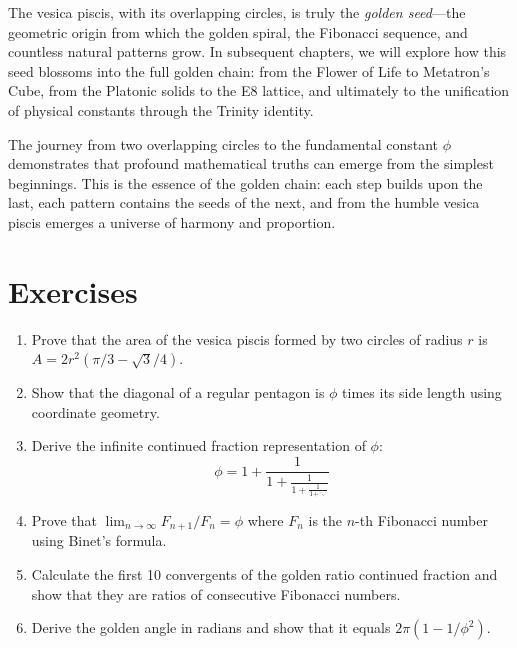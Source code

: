 The vesica piscis, with its overlapping circles, is truly the \emph{golden seed}—the geometric origin from which the golden spiral, the Fibonacci sequence, and countless natural patterns grow. In subsequent chapters, we will explore how this seed blossoms into the full golden chain: from the Flower of Life to Metatron's Cube, from the Platonic solids to the E8 lattice, and ultimately to the unification of physical constants through the Trinity identity.

The journey from two overlapping circles to the fundamental constant $\phi$ demonstrates that profound mathematical truths can emerge from the simplest beginnings. This is the essence of the golden chain: each step builds upon the last, each pattern contains the seeds of the next, and from the humble vesica piscis emerges a universe of harmony and proportion.

\section{Exercises}

\begin{enumerate}
    \item Prove that the area of the vesica piscis formed by two circles of radius $r$ is $A = 2r^2(\pi/3 - \sqrt{3}/4)$.
    \item Show that the diagonal of a regular pentagon is $\phi$ times its side length using coordinate geometry.
    \item Derive the infinite continued fraction representation of $\phi$:
    \[
    \phi = 1 + \frac{1}{1 + \frac{1}{1 + \frac{1}{1 + \ddots}}}
    \]
    \item Prove that $\lim_{n \to \infty} F_{n+1}/F_n = \phi$ where $F_n$ is the $n$-th Fibonacci number using Binet's formula.
    \item Calculate the first 10 convergents of the golden ratio continued fraction and show that they are ratios of consecutive Fibonacci numbers.
    \item Derive the golden angle in radians and show that it equals $2\pi(1 - 1/\phi^2)$.
\end{enumerate}

